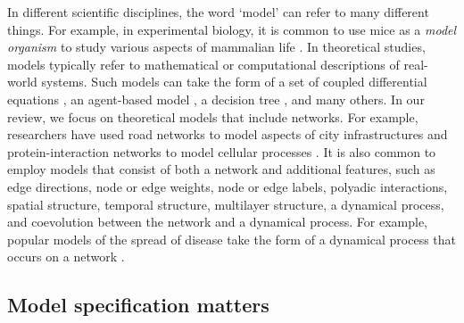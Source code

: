 \documentclass{comnet-mod}
\begin{document}
In different scientific disciplines, the word `model' can refer to many different things. For example, in experimental biology, it is common to use mice as a \textit{model organism} to study various aspects of mammalian life \cite{Lee1997, Couffinhal1998, Chiu2001, Hsieh-Li2000}. In theoretical studies, models typically refer to mathematical or computational descriptions of real-world systems. Such models can take the form of a set of coupled differential equations \cite{Jacobsen2008}, an agent-based model \cite{Nair2011}, a decision tree \cite{Walsh2013}, and many others. In our review, we focus on theoretical models that include networks. For example, researchers have used road networks to model aspects of city infrastructures \cite{Li2015a} and protein-interaction networks to model cellular processes \cite{Jeong2001, Hakes2008}. 
It is also common to employ models that consist of both a network and additional features, such as edge directions, node or edge weights, node or edge labels, polyadic interactions, spatial structure, temporal structure, multilayer structure, a dynamical process, and coevolution between the network and a dynamical process. For example, popular models of the spread of disease take the form of a dynamical process that occurs on a network \cite{Pastor-Satorras2015}.


\subsection{Model specification matters}\label{sec:model_matters}
\end{document}
